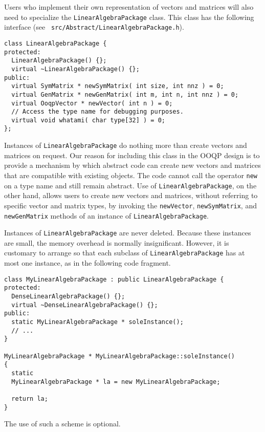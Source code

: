 Users who implement their own representation of vectors and matrices
will also need to specialize the \texttt{LinearAlgebraPackage}
class. This class has the following interface (see {\tt
src/Abstract/LinearAlgebraPackage.h}).
\begin{verbatim}
class LinearAlgebraPackage {
protected:
  LinearAlgebraPackage() {};
  virtual ~LinearAlgebraPackage() {};
public:
  virtual SymMatrix * newSymMatrix( int size, int nnz ) = 0;
  virtual GenMatrix * newGenMatrix( int m, int n, int nnz ) = 0;
  virtual OoqpVector * newVector( int n ) = 0;
  // Access the type name for debugging purposes.
  virtual void whatami( char type[32] ) = 0;
};
\end{verbatim}
Instances of \texttt{LinearAlgebraPackage} do nothing more than create
vectors and matrices on request. 
Our reason for including this class in the OOQP design is to provide a
mechanism by which abstract code can create new vectors and matrices
that are compatible with existing objects. The code cannot call the
operator \texttt{new} on a type name and still remain abstract. Use of
\texttt{LinearAlgebraPackage}, on the other hand, allows users to
create new vectors and matrices, without referring to specific vector
and matrix types, by invoking the \texttt{newVector},
\texttt{newSymMatrix}, and \texttt{newGenMatrix} methods of an
instance of \texttt{LinearAlgebraPackage}.

Instances of \texttt{LinearAlgebraPackage} are never deleted. Because
these instances are small, the memory overhead is normally
insignificant. However, it is customary to arrange so that each
subclass of \texttt{LinearAlgebraPackage} has at most one instance, as
in the following code fragment.
\begin{verbatim}
class MyLinearAlgebraPackage : public LinearAlgebraPackage {
protected:
  DenseLinearAlgebraPackage() {};
  virtual ~DenseLinearAlgebraPackage() {};
public:
  static MyLinearAlgebraPackage * soleInstance();
  // ...
}

MyLinearAlgebraPackage * MyLinearAlgebraPackage::soleInstance()
{
  static 
  MyLinearAlgebraPackage * la = new MyLinearAlgebraPackage;

  return la;
}
\end{verbatim}
The use of such a scheme is optional. 


